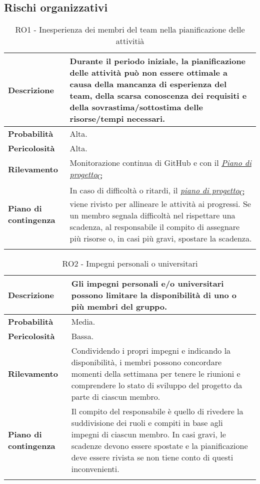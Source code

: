 \clearpage


\subsection{Rischi organizzativi}
\begin{longtable}{ | l | p{10cm} | }
    \hline
    \textbf{Descrizione} & Durante il periodo iniziale, la pianificazione delle attività può non essere ottimale a causa della mancanza di esperienza del team, della scarsa conoscenza dei requisiti e della sovrastima/sottostima delle risorse/tempi necessari. \\
    \hline
    \textbf{Probabilità} & Alta. \\
    \hline
    \textbf{Pericolosità} & Alta. \\
    \hline
    \textbf{Rilevamento} & Monitorazione continua di GitHub e con il \href{https://7last.github.io/docs/rtb/documentazione-interna/glossario#piano-di-progetto}{\textit{Piano di progetto}\textsubscript{G}} \\
    \hline
    \textbf{Piano di contingenza} & In caso di difficoltà o ritardi, il \href{https://7last.github.io/docs/rtb/documentazione-interna/glossario#piano-di-progetto}{\textit{piano di progetto}\textsubscript{G}} viene rivisto per allineare le attività ai progressi. Se un membro segnala difficoltà nel rispettare una scadenza, al responsabile il compito di assegnare più risorse o, in casi più gravi, spostare la scadenza.\\
    \hline
    \caption{RO1 - Inesperienza dei membri del team nella pianificazione delle attivitià}
    \label{table:1}
\end{longtable}

\newpage
\begin{longtable}{ | l | p{10cm} | }
    \hline
    \textbf{Descrizione} & Gli impegni personali e/o universitari possono limitare la disponibilità di uno o più membri del gruppo. \\
    \hline
    \textbf{Probabilità} & Media. \\
    \hline
    \textbf{Pericolosità} & Bassa. \\
    \hline
    \textbf{Rilevamento} & Condividendo i propri impegni e indicando la disponibilità, i membri possono concordare momenti della settimana per tenere le riunioni e comprendere lo stato di sviluppo del progetto da parte di ciascun membro. \\
    \hline
    \textbf{Piano di contingenza} & Il compito del responsabile è quello di rivedere la suddivisione dei ruoli e compiti in base agli impegni di ciascun membro. In casi gravi, le scadenze devono essere spostate e la pianificazione deve essere rivista se non tiene conto di questi inconvenienti.\\
    \hline
    \caption{RO2 - Impegni personali o universitari}
    \label{table:2}
\end{longtable}


